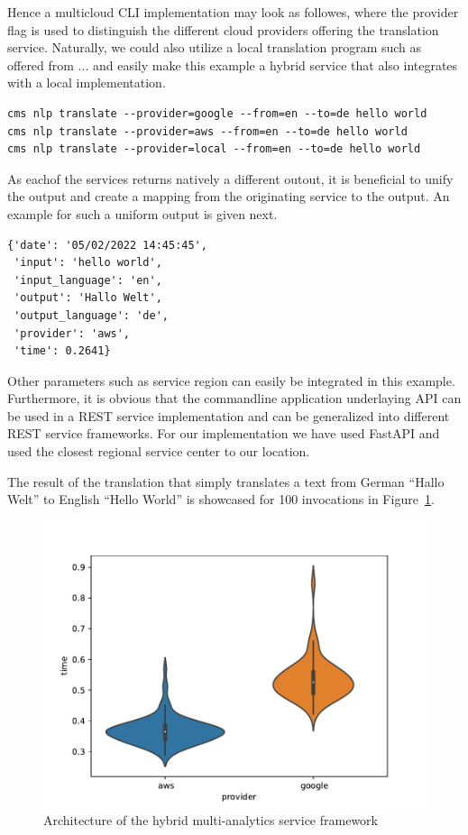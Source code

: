 Hence a multicloud CLI implementation may look as followes, where the
provider flag is used to distinguish the different cloud providers
offering the translation service. Naturally, we could also utilize a
local translation program such as offered from ... and easily make
this example a hybrid service that also integrates with a local
implementation.


\begin{Verbatim}[fontsize=\small]
cms nlp translate --provider=google --from=en --to=de hello world
cms nlp translate --provider=aws --from=en --to=de hello world
cms nlp translate --provider=local --from=en --to=de hello world
\end{Verbatim}


As eachof the services returns natively a different outout, it is
beneficial to unify the output and create a mapping from the
originating service to the output. An example for such a uniform output is given next.


\begin{Verbatim}[fontsize=\small]
{'date': '05/02/2022 14:45:45',
 'input': 'hello world',
 'input_language': 'en',
 'output': 'Hallo Welt',
 'output_language': 'de',
 'provider': 'aws',
 'time': 0.2641}
\end{Verbatim}


Other parameters such as service region can easily be integrated in
this example. Furthermore, it is obvious that the commandline
application underlaying API can be used in a REST service
implementation and can be generalized into different REST service
frameworks. For our implementation we have used FastAPI and used the
closest regional service center to our location.

The result of the translation that simply translates a text from
German ``Hallo Welt'' to English ``Hello World'' is showcased for 100
invocations in Figure~\ref{fig:translate}. 

\begin{figure}[htb]
  \begin{center}
    \includegraphics[width=1.0\columnwidth]{images/nlp-helloworldbenchmark.pdf}
    \end{center}
  \caption {Architecture of the hybrid multi-analytics service
    framework}
  \label{fig:translate}
\end{figure}

